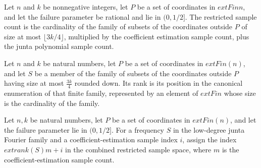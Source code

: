 \begin{definition}
\label{FABL.lowDegreeJuntaRestrictedSampleCount}
\leanok
{}
Let $n$ and $k$ be nonnegative integers, let $P$ be a set of coordinates in $	ext{Fin
}n$, and let the failure parameter be rational and lie in $(0,1/2]$. The restricted
sample count is the cardinality of the family of subsets of the coordinates outside $P$
of size at most $\lfloor 3k/4\rfloor$, multiplied by the coefficient estimation sample
count, plus the junta polynomial sample count.
\end{definition}

\begin{definition}
\label{FABL.lowDegreeJuntaFrequencyRank}
\leanok
{}
Let $n$ and $k$ be natural numbers, let $P$ be a set of coordinates in $	ext{Fin}(n)$,
and let $S$ be a member of the family of subsets of the coordinates outside $P$ having
size at most $\frac{3k}{4}$ rounded down. Its rank is its position in the canonical
enumeration of that finite family, represented by an element of $	ext{Fin}$ whose size
is the cardinality of the family.
\end{definition}

\begin{definition}
\label{FABL.lowDegreeJuntaCoefficientSampleIndex}
\leanok
{}
Let $n,k$ be natural numbers, let $P$ be a set of coordinates in $	ext{Fin}(n)$, and let
the failure parameter lie in $(0,1/2]$. For a frequency $S$ in the low-degree junta
Fourier family and a coefficient-estimation sample index $i$, assign the index
$	ext{rank}(S)m+i$ in the combined restricted sample space, where $m$ is the
coefficient-estimation sample count.
\end{definition}

